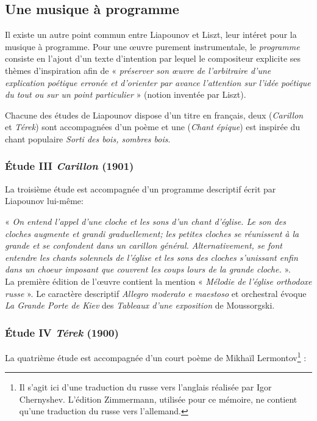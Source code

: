 \newpage

\subsection{Une musique à programme}

Il existe un autre point commun entre Liapounov et Liszt, leur intéret pour la musique à programme. Pour une œuvre purement instrumentale, le \emph{programme} consiste en l'ajout d'un texte d'intention par lequel le compositeur explicite ses thèmes d'inspiration afin de « \emph{préserver son œuvre de l'arbitraire d'une explication poétique erronée et d'orienter par avance l'attention sur l'idée poétique du tout ou sur un point particulier} » (notion inventée par Liszt).

Chacune des études de Liapounov dispose d'un titre en français, deux (\emph{Carillon} et \emph{Térek}) sont accompagnées d'un poème et une (\emph{Chant épique}) est inspirée du chant populaire \emph{Sorti des bois, sombres bois}.

\subsubsection{Étude III \emph{Carillon} (1901)}

La troisième étude est accompagnée d'un programme descriptif écrit par Liapounov lui-même:

« \emph{On entend l'appel d'une cloche et les sons d'un chant d'église. Le son des cloches augmente et grandi graduellement; les petites cloches se réunissent à la grande et se confondent dans un carillon général. Alternativement, se font entendre les chants solennels de l'église et les sons des cloches s’unissant enfin dans un choeur imposant que couvrent les coups lours de la grande cloche.} ».\\

La première édition de l'œuvre contient la mention « \emph{Mélodie de l’église orthodoxe russe} ». Le caractère descriptif \emph{Allegro moderato e maestoso} et orchestral évoque \emph{La Grande Porte de Kiev} des \emph{Tableaux d'une exposition} de Moussorgski.

\subsubsection{Étude IV \emph{Térek} (1900)}

La quatrième étude est accompagnée d'un court poème de Mikhaïl Lermontov\footnote{Il s'agit ici d'une traduction du russe vers l'anglais réalisée par Igor Chernyshev. L'édition Zimmermann, utilisée pour ce mémoire, ne contient qu'une traduction du russe vers l'allemand.} :


